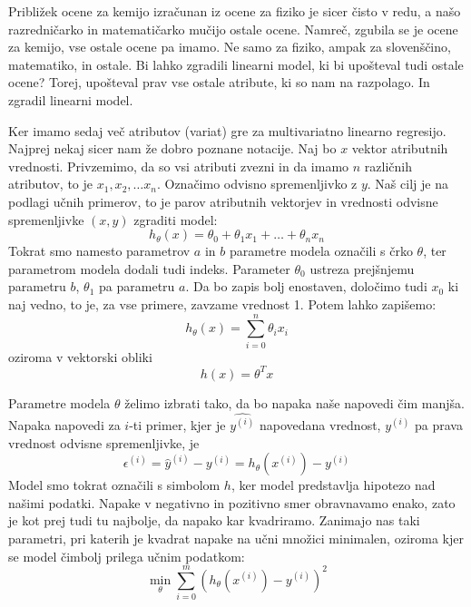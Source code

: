 Približek ocene za kemijo izračunan iz ocene za fiziko je sicer čisto
v redu, a našo razredničarko in matematičarko mučijo ostale
ocene. Namreč, zgubila se je ocene za kemijo, vse ostale ocene pa
imamo. Ne samo za fiziko, ampak za slovenščino, matematiko, in
ostale. Bi lahko zgradili linearni model, ki bi upošteval tudi ostale
ocene? Torej, upošteval prav vse ostale atribute, ki so nam na
razpolago. In zgradil linearni model.

Ker imamo sedaj več atributov (variat) gre za multivariatno linearno
regresijo. Najprej nekaj sicer nam že dobro poznane notacije. Naj bo $x$ vektor atributnih vrednosti. Privzemimo, da so vsi atributi zvezni in da imamo $n$ različnih atributov, to je $x_1, x_2,\ldots x_n$. Označimo odvisno spremenljivko z $y$. Naš cilj je na podlagi učnih primerov, to je parov atributnih vektorjev in vrednosti odvisne spremenljivke $(x,y)$ zgraditi model:
%
\begin{equation}
h_\theta(x)=\theta_0 + \theta_1 x_1 + \ldots + \theta_n x_n
\end{equation}
%
Tokrat smo namesto parametrov $a$ in $b$ parametre modela označili s
črko $\theta$, ter parametrom modela dodali tudi indeks. Parameter
$\theta_0$ ustreza prejšnjemu parametru $b$, $\theta_1$ pa parametru
$a$. Da bo zapis bolj enostaven, določimo tudi $x_0$ ki naj vedno, to je, za vse primere, zavzame vrednost 1. Potem lahko zapišemo:
\begin{equation}
h_\theta(x) =\sum_{i=0}^n \theta_i x_i
\end{equation}
oziroma v vektorski obliki
\begin{equation}
h(x)=\theta^T x
\end{equation}

Parametre modela $\theta$ želimo izbrati tako, da bo napaka naše napovedi čim manjša. Napaka napovedi za $i$-ti primer, kjer je $\hat{y^{(i)}}$ napovedana vrednost, $y^{(i)}$ pa prava vrednost odvisne spremenljivke, je
%
\begin{equation}
\epsilon^{(i)}=\hat{y}^{(i)}-y^{(i)}=h_\theta(x^{(i)})-y^{(i)}
\end{equation}
%
Model smo tokrat označili s simbolom $h$, ker model predstavlja
hipotezo nad našimi podatki. Napake v negativno in pozitivno smer
obravnavamo enako, zato je kot prej tudi tu najbolje, da napako kar
kvadriramo. Zanimajo nas taki parametri, pri katerih je kvadrat napake
na učni množici minimalen, oziroma kjer se model čimbolj prilega učnim
podatkom:
\begin{equation}
\min_\theta\sum_{i=0}^m(h_\theta(x^{(i)})-y^{(i)})^2
\end{equation}

